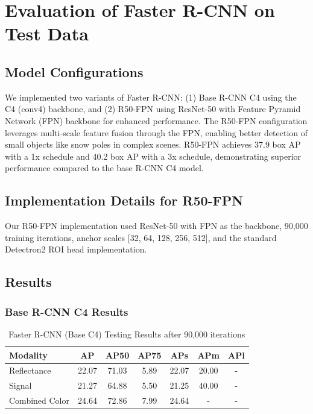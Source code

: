 \documentclass[11pt]{article}
\begin{document}
\section{Evaluation of Faster R-CNN on Test Data}
\subsection{Model Configurations}
We implemented two variants of Faster R-CNN: (1) Base R-CNN C4 using the C4 (conv4) backbone, and (2) R50-FPN using ResNet-50 with Feature Pyramid Network (FPN) backbone for enhanced performance. The R50-FPN configuration leverages multi-scale feature fusion through the FPN, enabling better detection of small objects like snow poles in complex scenes. R50-FPN achieves 37.9 box AP with a 1x schedule and 40.2 box AP with a 3x schedule, demonstrating superior performance compared to the base R-CNN C4 model.

\subsection{Implementation Details for R50-FPN}
Our R50-FPN implementation used ResNet-50 with FPN as the backbone, 90,000 training iterations, anchor scales [32, 64, 128, 256, 512], and the standard Detectron2 ROI head implementation.

\subsection{Results}
\subsubsection{Base R-CNN C4 Results}
\begin{table}[h!]
    \centering
    \small
    \caption{Faster R-CNN (Base C4) Testing Results after 90,000 iterations}
    \begin{tabular}{@{}lcccccc@{}}
        \toprule
        Modality & AP & AP50 & AP75 & APs & APm & APl \\
        \midrule
        Reflectance & 22.07 & 71.03 & 5.89 & 22.07 & 20.00 & - \\
        Signal & 21.27 & 64.88 & 5.50 & 21.25 & 40.00 & - \\
        Combined Color & 24.64 & 72.86 & 7.99 & 24.64 & - & - \\
        \bottomrule
    \end{tabular}
    \label{tab:faster_rcnn_c4_results}
\end{table}
\end{document}
